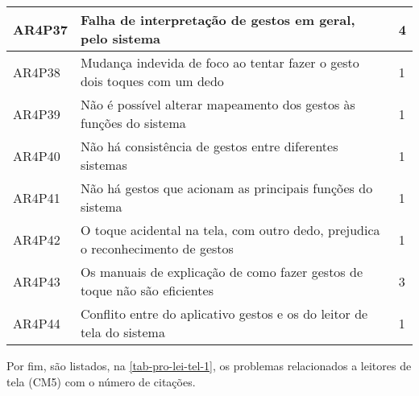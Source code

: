 \begin{table}[htb]
\begin{center}
\begin{tabular}{p{1.2cm}|p{12.0cm}|p{1.2cm}}
      \hline
      AR4P37          & Falha de interpretação de gestos em geral, pelo sistema                            & 4                 \\
      \hline
      AR4P38          & Mudança indevida de foco ao tentar fazer o gesto dois toques com um dedo           & 1                 \\
      \hline
      AR4P39          & Não é possível alterar mapeamento dos gestos às funções do sistema                 & 1                 \\
      \hline
      AR4P40          & Não há consistência de gestos entre diferentes sistemas                            & 1                 \\
      \hline
      AR4P41          & Não há gestos que acionam as principais funções do sistema                         & 1                 \\
      \hline
      AR4P42          & O toque acidental na tela, com outro dedo, prejudica o reconhecimento de gestos    & 1                 \\
      \hline
      AR4P43          & Os manuais de explicação de como fazer gestos de toque não são eficientes          & 3                 \\
      \hline
      AR4P44          & Conflito entre do aplicativo gestos e os do leitor de tela do sistema              & 1                 \\
    \end{tabular}
  \end{center}
\end{table}

\newpage

Por fim, são listados, na \autoref{tab-pro-lei-tel-1}, os problemas relacionados a leitores de tela (CM5) com o número de citações.

